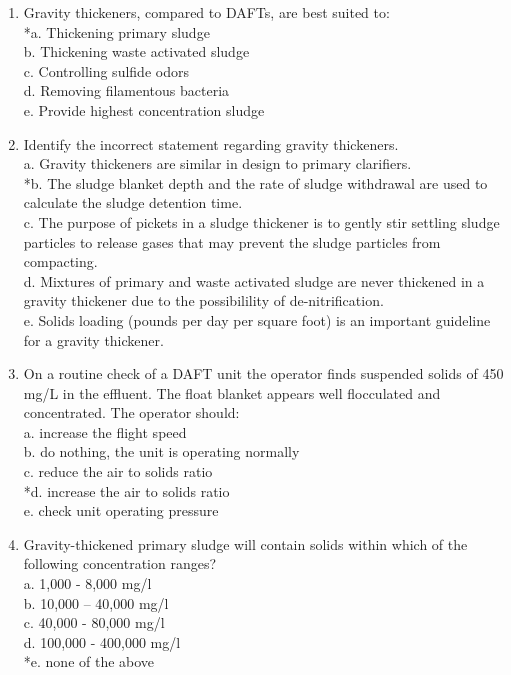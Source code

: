 \begin{enumerate}
\item  Gravity thickeners, compared to DAFTs, are best suited to: \\

*a. Thickening primary sludge \\
b. Thickening waste activated sludge \\
c. Controlling sulfide odors \\
d. Removing filamentous bacteria \\
e. Provide highest concentration sludge \\

\item  Identify the incorrect statement regarding gravity thickeners. \\

a. Gravity thickeners are similar in design to primary clarifiers. \\
*b. The sludge blanket depth and the rate of sludge withdrawal are used to calculate the sludge detention time. \\
c. The purpose of pickets in a sludge thickener is to gently stir settling sludge particles to release gases that may prevent the sludge particles from compacting. \\
d. Mixtures of primary and waste activated sludge are never thickened in a gravity thickener due to the possibilility of de-nitrification. \\
e. Solids loading (pounds per day per square foot) is an important guideline for a gravity thickener. \\

\item  On a routine check of a DAFT unit the operator finds suspended solids of 450 mg/L in the effluent.  The float blanket appears well flocculated and concentrated. The operator should: \\

a. increase the flight speed \\
b. do nothing, the unit is operating normally \\
c. reduce the air to solids ratio \\
*d. increase the air to solids ratio \\
e. check unit operating pressure \\

\item  Gravity-thickened primary sludge will contain solids within which of the following concentration ranges? \\

a. 1,000 - 8,000 mg/l \\
b. 10,000 – 40,000 mg/l \\
c. 40,000 - 80,000 mg/l \\
d. 100,000 - 400,000 mg/l \\
*e. none of the above \\




\end{enumerate}